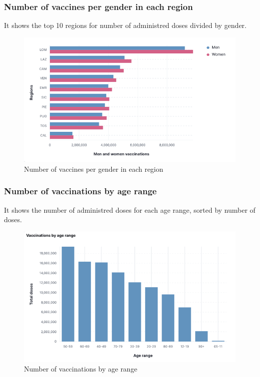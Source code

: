 \documentclass[12pt, a4paper]{article}
\begin{document}
\subsubsection{Number of vaccines per gender in each region}
It shows the top 10 regions for number of administred doses divided by gender.
\begin{figure}[ht]
  \centering
  \includegraphics[width=.8\linewidth]{img (14).png}
\caption*{Number of vaccines per gender in each region}
\end{figure}

\subsubsection{Number of vaccinations by age range}
It shows the number of administred doses for each age range, sorted by number of doses.
\begin{figure}[ht]
  \centering
  \includegraphics[width=.8\linewidth]{img (15).png}
\caption*{Number of vaccinations by age range}
\end{figure}
\end{document}
